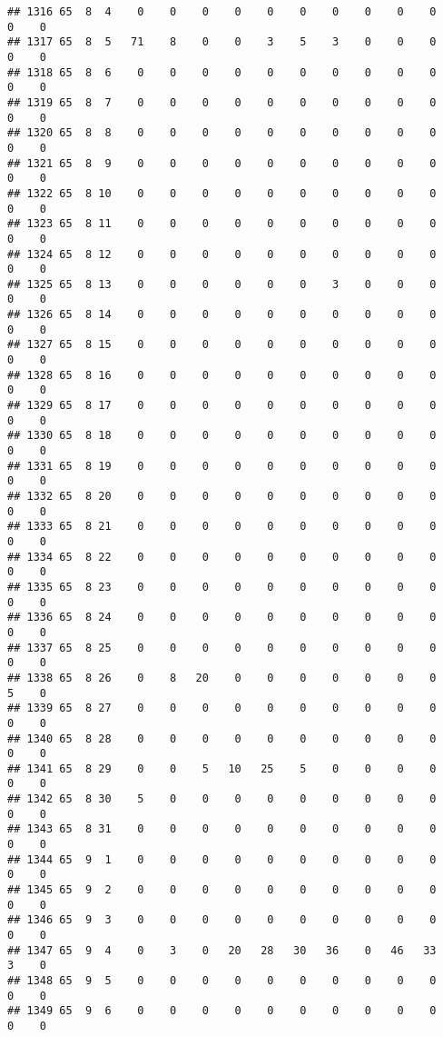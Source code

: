 \documentclass[]{article}
\begin{document}
\begin{verbatim}
## 1316 65  8  4    0    0    0    0    0    0    0    0    0    0    0    0
## 1317 65  8  5   71    8    0    0    3    5    3    0    0    0    0    0
## 1318 65  8  6    0    0    0    0    0    0    0    0    0    0    0    0
## 1319 65  8  7    0    0    0    0    0    0    0    0    0    0    0    0
## 1320 65  8  8    0    0    0    0    0    0    0    0    0    0    0    0
## 1321 65  8  9    0    0    0    0    0    0    0    0    0    0    0    0
## 1322 65  8 10    0    0    0    0    0    0    0    0    0    0    0    0
## 1323 65  8 11    0    0    0    0    0    0    0    0    0    0    0    0
## 1324 65  8 12    0    0    0    0    0    0    0    0    0    0    0    0
## 1325 65  8 13    0    0    0    0    0    0    3    0    0    0    0    0
## 1326 65  8 14    0    0    0    0    0    0    0    0    0    0    0    0
## 1327 65  8 15    0    0    0    0    0    0    0    0    0    0    0    0
## 1328 65  8 16    0    0    0    0    0    0    0    0    0    0    0    0
## 1329 65  8 17    0    0    0    0    0    0    0    0    0    0    0    0
## 1330 65  8 18    0    0    0    0    0    0    0    0    0    0    0    0
## 1331 65  8 19    0    0    0    0    0    0    0    0    0    0    0    0
## 1332 65  8 20    0    0    0    0    0    0    0    0    0    0    0    0
## 1333 65  8 21    0    0    0    0    0    0    0    0    0    0    0    0
## 1334 65  8 22    0    0    0    0    0    0    0    0    0    0    0    0
## 1335 65  8 23    0    0    0    0    0    0    0    0    0    0    0    0
## 1336 65  8 24    0    0    0    0    0    0    0    0    0    0    0    0
## 1337 65  8 25    0    0    0    0    0    0    0    0    0    0    0    0
## 1338 65  8 26    0    8   20    0    0    0    0    0    0    0    5    0
## 1339 65  8 27    0    0    0    0    0    0    0    0    0    0    0    0
## 1340 65  8 28    0    0    0    0    0    0    0    0    0    0    0    0
## 1341 65  8 29    0    0    5   10   25    5    0    0    0    0    0    0
## 1342 65  8 30    5    0    0    0    0    0    0    0    0    0    0    0
## 1343 65  8 31    0    0    0    0    0    0    0    0    0    0    0    0
## 1344 65  9  1    0    0    0    0    0    0    0    0    0    0    0    0
## 1345 65  9  2    0    0    0    0    0    0    0    0    0    0    0    0
## 1346 65  9  3    0    0    0    0    0    0    0    0    0    0    0    0
## 1347 65  9  4    0    3    0   20   28   30   36    0   46   33    3    0
## 1348 65  9  5    0    0    0    0    0    0    0    0    0    0    0    0
## 1349 65  9  6    0    0    0    0    0    0    0    0    0    0    0    0

\end{verbatim}
\end{document}
